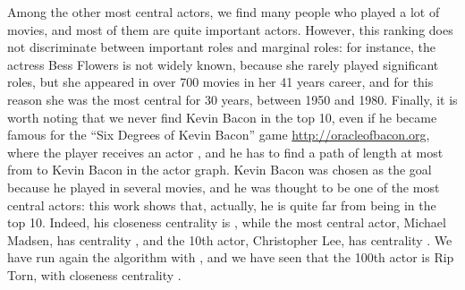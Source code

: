 \documentclass{acm_proc_article-sp}
\begin{document}
Among the other most central actors, we find many people who played a lot of movies, and most of them are quite important actors. However, this ranking does not discriminate between important roles and marginal roles: for instance, the actress Bess Flowers is not widely known, because she rarely played significant roles, but she appeared in over 700 movies in her 41 years career, and for this reason she was the most central for 30 years, between 1950 and 1980. Finally, it is worth noting that we never find Kevin Bacon in the top 10, even if he became famous for the ``Six Degrees of Kevin Bacon'' game \url{http://oracleofbacon.org}, where the player receives an actor , and he has to find a path of length at most  from  to Kevin Bacon in the actor graph. Kevin Bacon was chosen as the goal because he played in several movies, and he was thought to be one of the most central actors: this work shows that, actually, he is quite far from being in the top 10. Indeed, his closeness centrality is , while the most central actor, Michael Madsen, has centrality , and the 10th actor, Christopher Lee, has centrality . We have run again the algorithm with , and we have seen that the 100th actor is Rip Torn, with closeness centrality .




\end{document}
